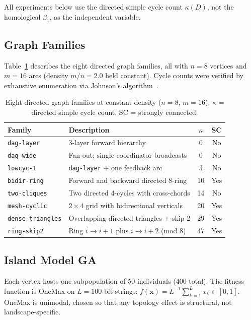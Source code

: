 \documentclass{llncs}
\begin{document}
All experiments below use the directed simple cycle count $\kappa(D)$, not the
homological $\beta_1$, as the independent variable.

\subsection{Graph Families}

Table~\ref{tab:families} describes the eight directed graph families, all with
$n = 8$ vertices and $m = 16$ arcs (density $m/n = 2.0$ held constant). Cycle
counts were verified by exhaustive enumeration via Johnson's
algorithm~\cite{johnson1975finding}.

\begin{table}[t]
\centering
\caption{Eight directed graph families at constant density ($n=8$, $m=16$).
$\kappa$ = directed simple cycle count. SC = strongly connected.}
\label{tab:families}
\begin{tabular}{llcc}
\toprule
Family & Description & $\kappa$ & SC \\
\midrule
\texttt{dag-layer}      & 3-layer forward hierarchy                  &  0 & No  \\
\texttt{dag-wide}       & Fan-out; single coordinator broadcasts     &  0 & No  \\
\texttt{lowcyc-1}       & \texttt{dag-layer} + one feedback arc      &  3 & No  \\
\texttt{bidir-ring}     & Forward and backward directed 8-ring       & 10 & Yes \\
\texttt{two-cliques}    & Two directed 4-cycles with cross-chords    & 14 & No  \\
\texttt{mesh-cyclic}    & $2\times4$ grid with bidirectional verticals & 20 & Yes \\
\texttt{dense-triangles}& Overlapping directed triangles + skip-2    & 29 & Yes \\
\texttt{ring-skip2}     & Ring $i{\to}i{+}1$ plus $i{\to}i{+}2$ (mod 8) & 47 & Yes \\
\bottomrule
\end{tabular}
\end{table}

\subsection{Island Model GA}

Each vertex hosts one subpopulation of 50 individuals (400 total). The fitness
function is OneMax on $L = 100$-bit strings:
$f(\mathbf{x}) = L^{-1}\sum_{k=1}^{L} x_k \in [0, 1]$. OneMax is unimodal,
chosen so that any topology effect is structural, not landscape-specific.
\end{document}
